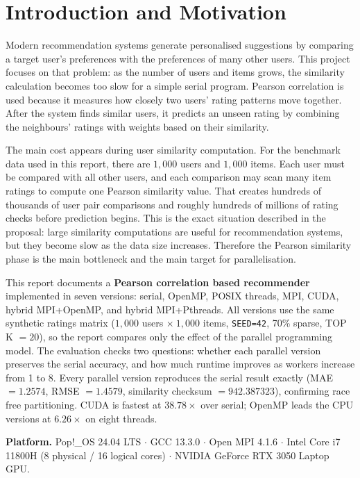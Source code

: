 \documentclass[11pt,a4paper]{article}
\newcommand{\code}[1]{\texttt{\small #1}}
\begin{document}
\section{Introduction and Motivation}\label{sec:intro}

Modern recommendation systems generate personalised suggestions by comparing a
target user's preferences with the preferences of many other users. This project
focuses on that problem: as the number of users and items grows, the similarity
calculation becomes too slow for a simple serial program. Pearson correlation is
used because it measures how closely two users' rating patterns move together.
After the system finds similar users, it predicts an unseen rating by combining
the neighbours' ratings with weights based on their similarity.

The main cost appears during user similarity computation. For the benchmark data
used in this report, there are $1{,}000$ users and $1{,}000$ items. Each user
must be compared with all other users, and each comparison may scan many item
ratings to compute one Pearson similarity value. That creates hundreds of
thousands of user pair comparisons and roughly hundreds of millions of rating
checks before prediction begins. This is the exact situation described in the
proposal: large similarity computations are useful for recommendation systems,
but they become slow as the data size increases. Therefore the Pearson
similarity phase is the main bottleneck and the main target for parallelisation.

This report documents a \textbf{Pearson correlation based recommender}
implemented in seven versions: serial, OpenMP, POSIX threads, MPI, CUDA, hybrid
MPI+OpenMP, and hybrid MPI+Pthreads. All versions use the same synthetic
ratings matrix ($1{,}000$ users $\times\ 1{,}000$ items, \code{SEED=42}, 70\%
sparse, TOP K $= 20$), so the report compares only the effect of the
parallel programming model. The evaluation checks two questions: whether each
parallel version preserves the serial accuracy, and how much runtime improves
as workers increase from 1 to 8. Every parallel version reproduces the serial
result exactly (MAE $=1.2574$, RMSE $=1.4579$, similarity checksum
$=942.387323$), confirming race free partitioning. CUDA is fastest at
$38.78\times$ over serial; OpenMP leads the CPU versions at $6.26\times$ on
eight threads.

\vspace{0.6em}
\noindent\textbf{Platform.} Pop!\_OS 24.04 LTS $\cdot$ GCC 13.3.0 $\cdot$ Open MPI
4.1.6 $\cdot$ Intel Core i7 11800H (8 physical / 16 logical
cores) $\cdot$ NVIDIA GeForce RTX 3050 Laptop GPU.
\end{document}
